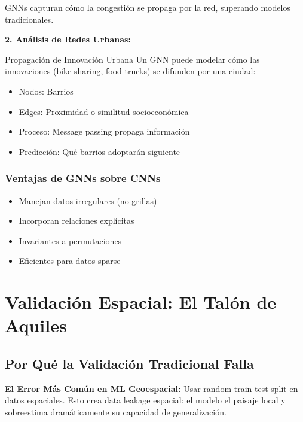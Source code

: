 \documentclass[12pt,a4paper]{article}
\begin{document}
GNNs capturan cómo la congestión se propaga por la red, superando modelos tradicionales.

\textbf{2. Análisis de Redes Urbanas:}

\begin{ejemplo}{Propagación de Innovación Urbana}
Un GNN puede modelar cómo las innovaciones (bike sharing, food trucks) se difunden por una ciudad:
\begin{itemize}
    \item Nodos: Barrios
    \item Edges: Proximidad o similitud socioeconómica
    \item Proceso: Message passing propaga información
    \item Predicción: Qué barrios adoptarán siguiente
\end{itemize}
\end{ejemplo}

\subsubsection{Ventajas de GNNs sobre CNNs}

\begin{itemize}
    \item Manejan datos irregulares (no grillas)
    \item Incorporan relaciones explícitas
    \item Invariantes a permutaciones
    \item Eficientes para datos sparse
\end{itemize}

\section{Validación Espacial: El Talón de Aquiles}

\subsection{Por Qué la Validación Tradicional Falla}

\begin{alertbox}
\textbf{El Error Más Común en ML Geoespacial:}
Usar random train-test split en datos espaciales. Esto crea data leakage espacial: el modelo  el paisaje local y sobreestima dramáticamente su capacidad de generalización.
\end{alertbox}
\end{document}
